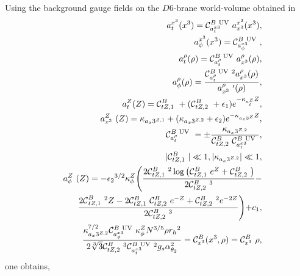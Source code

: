 Using the background gauge fields on the $D6$-brane world-volume obtained in \cite{Shivam+Aalok_Photoproduction+EoS}
\begin{eqnarray}
\label{Amu-UV-B}
& & a_t^{x^3}(x^3)={\cal C}_{a_t^{x3}}^{B\ {\rm UV}}\  a_{x^3}^{x^3}(x^3),\nonumber\\
& & a_\phi^{x^3}(x^3)={\cal C}_{a_\phi^{x3}}^{B\ {\rm UV}}\ ,\nonumber\\
& & a_t^\rho(\rho)={\cal C}_{a_t^\rho}^{B\ {\rm UV}}\  a_{x^3}^\rho(\rho),\nonumber\\
& & a_\phi^\rho(\rho)=\frac{{\cal C}_{a_t^\rho}^{B\ {\rm UV}}\ ^2 a_{x^3}^\rho(\rho)}{a_{x^3}^\rho\ '(\rho)},\nonumber\\
& & a_t^Z(Z)={\cal C}_{tZ,1}^B\ +({\cal C}_{tZ,2}^B\ +{\epsilon_1})
   e^{-\kappa_{a_t^Z} Z},\nonumber\\
& & a_{x^3}^Z\ (Z)=\kappa_{a_x3^{Z,1}}+(\kappa_{a_x3^{Z,2}}+{\epsilon_2})
   e^{-\kappa_{a_x3^Z} Z},\nonumber\\
& & {\cal C}_{a_t^\rho}^{B\ {\rm UV}}\  =  \pm   \frac{\kappa_{a_x3^{Z,2}}}{{\cal C}_{tZ,2}^B\  {\cal C}_{a_t^{x3}}^{B\ {\rm UV}}\ },\nonumber\\
& & |{\cal C}_{tZ,1}^B\ |\ll1, |\kappa_{a_x3^{Z,2}}|\ll1,\nonumber\\
 & & a_\phi^Z\  (Z) = -{\epsilon_2}^{3/2}\kappa_\phi^Z \Biggl (\frac{
   2 {\cal C}_{tZ,1}^B\ ^2 \log
\left({\cal C}_{tZ,1}^B\  e^Z+{\cal C}_{tZ,2}^B\ \right)}{2{\cal C}_{tZ,2}^B\ ^3}- \nonumber\\ & & \quad
\frac{{2\cal C}_{tZ,1}^B\ ^2 Z-2 {\cal C}_{tZ,1}^B\  {\cal C}_{tZ,2}^B\ 
e^{-Z}+{\cal C}_{tZ,2}^B\ ^2 e^{-2 Z}}{2{\cal C}_{tZ,2}^B\ ^3} \Biggl) + c_1,\nonumber\\
& & \frac{\kappa_{a_x3^{Z,2}}^{7/2} {\cal C}_{a_\phi^{x3}}^{B\ {\rm UV}}\ 
   \kappa_\phi^Z  N^{3/5} \rho  {r_h}^2}{2 \sqrt[3]{3}
   {\cal C}_{tZ,2}^B\ ^3 {\cal C}_{a_t^{x3}}^{B\ {\rm UV}}\ ^2 {g_s} \alpha
   _{\theta _2}^2}={\cal C}_{x^3}^B(x^3, \rho)={\cal C}_{x^3}^B\  \rho,
\end{eqnarray}
one obtains,
